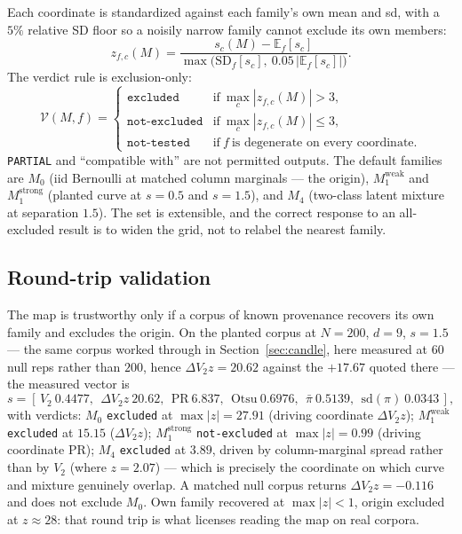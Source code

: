 \documentclass[11pt,a4paper]{article}
\theoremstyle{plain}
\theoremstyle{remark}
\theoremstyle{plain}
\begin{document}
Each coordinate is standardized against each family's own mean and sd, with a $5\%$ relative SD floor so a noisily narrow family cannot exclude its own members:
\begin{equation}
z_{f,c}(M)=\frac{s_c(M)-\mathbb{E}_f[s_c]}{\max\!\big(\mathrm{SD}_f[s_c],\ 0.05\,|\mathbb{E}_f[s_c]|\big)} .
\label{eq:family-z}
\end{equation}
The verdict rule is exclusion-only:
\begin{equation}
\mathcal{V}(M,f)=
\begin{cases}
\texttt{excluded} & \text{if}\ \max_c|z_{f,c}(M)|>3,\\
\texttt{not-excluded} & \text{if}\ \max_c|z_{f,c}(M)|\le3,\\
\texttt{not-tested} & \text{if}\ f\ \text{is degenerate on every coordinate.}
\end{cases}
\label{eq:verdicts}
\end{equation}
\texttt{PARTIAL} and ``compatible with'' are not permitted outputs. The default families are $M_0$ (iid Bernoulli at matched column marginals --- the origin), $M_1^{\mathrm{weak}}$ and $M_1^{\mathrm{strong}}$ (planted curve at $s=0.5$ and $s=1.5$), and $M_4$ (two-class latent mixture at separation $1.5$). The set is extensible, and the correct response to an all-excluded result is to widen the grid, not to relabel the nearest family.

\subsection{Round-trip validation}

The map is trustworthy only if a corpus of known provenance recovers its own family and excludes the origin. On the planted corpus at $N=200$, $d=9$, $s=1.5$ --- the same corpus worked through in Section~\ref{sec:candle}, here measured at $60$ null reps rather than $200$, hence $\Delta V_2z=20.62$ against the $+17.67$ quoted there --- the measured vector is
\begin{equation}
s=[\,V_2\ 0.4477,\ \ \Delta V_2z\ 20.62,\ \ \mathrm{PR}\ 6.837,\ \ \mathrm{Otsu}\ 0.6976,\ \ \bar\pi\ 0.5139,\ \ \mathrm{sd}(\pi)\ 0.0343\,],
\label{eq:roundtrip}
\end{equation}
with verdicts: $M_0$ \texttt{excluded} at $\max|z|=27.91$ (driving coordinate $\Delta V_2z$); $M_1^{\mathrm{weak}}$ \texttt{excluded} at $15.15$ ($\Delta V_2z$); $M_1^{\mathrm{strong}}$ \texttt{not-excluded} at $\max|z|=0.99$ (driving coordinate $\mathrm{PR}$); $M_4$ \texttt{excluded} at $3.89$, driven by column-marginal spread rather than by $V_2$ (where $z=2.07$) --- which is precisely the coordinate on which curve and mixture genuinely overlap. A matched null corpus returns $\Delta V_2z=-0.116$ and does not exclude $M_0$. Own family recovered at $\max|z|<1$, origin excluded at $z\approx28$: that round trip is what licenses reading the map on real corpora.
\end{document}

